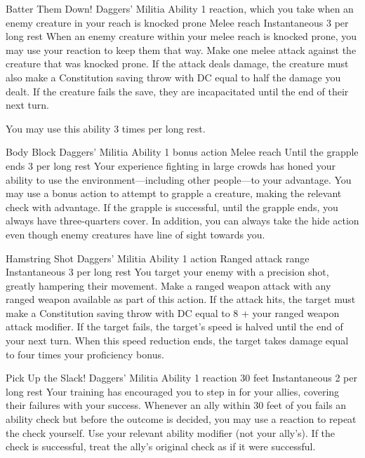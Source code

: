 \ability%
    {Batter Them Down!}
    {Daggers' Militia Ability}
    {1 reaction, which you take when an enemy creature in your reach is knocked prone}
    {Melee reach}
    {Instantaneous}
    {3 per long rest}
When an enemy creature within your melee reach is knocked prone,
you may use your reaction to keep them that way. 
Make one melee attack against the creature
that was knocked prone.
If the attack deals damage,
the creature must also make a Constitution saving throw
with DC equal to half the damage you dealt.
If the creature fails the save,
they are incapacitated until the end of their next turn.

You may use this ability 3 times per long rest.


\ability%
    {Body Block}
    {Daggers' Militia Ability}
    {1 bonus action}
    {Melee reach}
    {Until the grapple ends}
    {3 per long rest}
Your experience fighting in large crowds
has honed your ability to use the environment---including
other people---to your advantage.
You may use a bonus action to attempt to grapple a creature,
making the relevant check with advantage.
If the grapple is successful,
until the grapple ends,
you always have three-quarters cover.
In addition,
you can always take the hide action even though enemy creatures
have line of sight towards you.


\ability%
    {Hamstring Shot}
    {Daggers' Militia Ability}
    {1 action}
    {Ranged attack range}
    {Instantaneous}
    {3 per long rest}
You target your enemy with a precision shot,
greatly hampering their movement.
Make a ranged weapon attack with any ranged weapon available
as part of this action.
If the attack hits,
the target must make a Constitution saving throw
with DC equal to 8 + your ranged weapon attack modifier.
If the target fails,
the target's speed is halved until the end of your next turn.
When this speed reduction ends,
the target takes damage equal to four times your proficiency bonus.

\ability%
    {Pick Up the Slack!}
    {Daggers' Militia Ability}
    {1 reaction}
    {30 feet}
    {Instantaneous}
    {2 per long rest}
Your training has encouraged you to step in for your allies,
covering their failures with your success.
Whenever an ally within 30 feet of you fails an ability check
but before the outcome is decided,
you may use a reaction to repeat the check yourself.
Use your relevant ability modifier (not your ally's).
If the check is successful,
treat the ally's original check as if it were successful.


